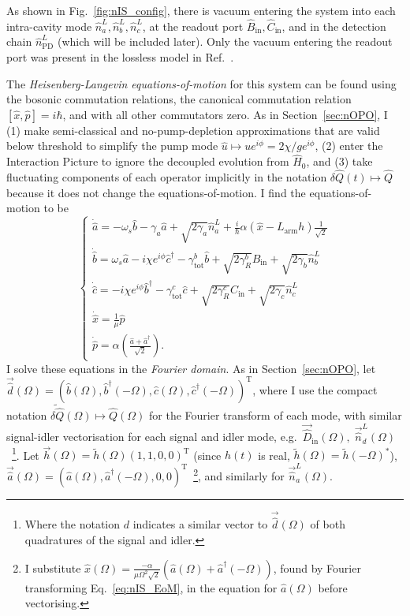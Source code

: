 As shown in Fig.~\ref{fig:nIS_config}, there is vacuum entering the system into each intra-cavity mode $\hat n^L_a, \hat n^L_b, \hat n^L_c$, at the readout port $\hat B_\text{in}, \hat C_\text{in}$, and in the detection chain $\hat n^L_\text{PD}$ (which will be included later). Only the vacuum entering the readout port was present in the lossless model in Ref.~\cite{liBroadbandSensitivityImprovement2020}.

The \emph{Heisenberg-Langevin equations-of-motion} for this system can be found using the bosonic commutation relations, the canonical commutation relation $[\hat x,\hat p]=i\hbar$, and with all other commutators zero. As in Section~\ref{sec:nOPO}, I (1) make semi-classical and no-pump-depletion approximations that are valid below threshold to simplify the pump mode $\hat u\mapsto u e^{i\phi}=2\chi/g e^{i\phi}$, (2) enter the Interaction Picture to ignore the decoupled evolution from $\hat H_0$, and (3) take fluctuating components of each operator implicitly in the notation $\delta\hat{Q}(t)\mapsto\hat{Q}$ because it does not change the equations-of-motion. I find the equations-of-motion to be
\begin{equation}\label{eq:nIS_EoM}
\begin{cases}
\dot{\hat{a}}=-\omega_s\hat{b} - \gamma_a \hat{a} + \sqrt{2\gamma_a}\hat{n}^L_a+\frac{i}{\hbar}\alpha(\hat{x}-L_\mathrm{arm}h)\frac{1}{\sqrt{2}}\\
\dot{\hat{b}}=\omega_s\hat{a} - i\chi e^{i\phi}\hat{c}^\dagger - \gamma^b_\mathrm{tot} \hat{b} + \sqrt{2\gamma^b_R}\hat{B}_\mathrm{in} + \sqrt{2\gamma_b}\hat{n}^L_b\\
\dot{\hat{c}}=-i\chi e^{i\phi}\hat{b}^\dagger - \gamma^c_\mathrm{tot} \hat{c} + \sqrt{2\gamma^c_R}\hat{C}_\mathrm{in} + \sqrt{2\gamma_c}\hat{n}^L_c\\
\dot{\hat{x}}=\frac{1}{\mu}\hat{p}\\
\dot{\hat{p}}=\alpha\left(\frac{\hat{a}+\hat{a}^\dag}{\sqrt{2}}\right).
\end{cases}
\end{equation}
I solve these equations in the \emph{Fourier domain}. As in Section~\ref{sec:nOPO}, let $\vec{\hat d}(\Omega)=(\hat b(\Omega), \hat b^\dag(-\Omega), \hat c(\Omega), \hat c^\dag(-\Omega))^\text{T}$, where I use the compact notation $\tilde{\delta\hat{Q}}(\Omega)\mapsto\hat{Q}(\Omega)$ for the Fourier transform of each mode, with similar signal-idler vectorisation for each signal and idler mode, e.g.\ $\vec{\hat{D}}_\text{in}(\Omega),\; \vec{\hat n}^L_d(\Omega)$~\footnote{Where the notation $d$ indicates a similar vector to $\vec{\hat d}(\Omega)$ of both quadratures of the signal and idler.}. Let $\vec h(\Omega)=\tilde h(\Omega) (1,1,0,0)^\text{T}$ (since $h(t)$ is real, $\tilde h(\Omega)=\tilde h(-\Omega)^*$), $\vec{\hat a}(\Omega)=(\hat a(\Omega), \hat a^\dag(-\Omega),0,0)^\text{T}$~\footnote{I substitute $\hat x(\Omega) = \frac{-\alpha}{\mu\Omega^2\sqrt2}\left(\hat{a}(\Omega)+\hat{a}^\dag(-\Omega)\right)$, found by Fourier transforming Eq.~\ref{eq:nIS_EoM}, in the equation for $\hat a(\Omega)$ before vectorising.}, and similarly for $\vec{\hat n}^L_a(\Omega)$.
